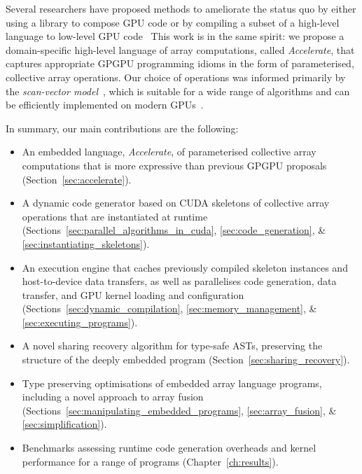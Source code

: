 Several researchers have proposed methods to ameliorate the status quo by either
using a library to compose GPU code or by compiling a subset of a high-level
language to low-level GPU
code~\cite{McCool:2004,Bond:2010bd,ThrustAParallelT:ub,Catanzaro:2011cn,Mainland:2010vj,CLyther:EvXSiruK}
This work is in the same spirit: we propose a domain-specific high-level
language of array computations, called \emph{Accelerate}, that captures
appropriate GPGPU programming idioms in the form of parameterised, collective
array operations. Our choice of operations was informed primarily by the
\emph{scan-vector model}~\cite{Chatterjee:1990vj}, which is suitable for a wide
range of algorithms and can be efficiently implemented on modern
GPUs~\cite{Sengupta:2007tc}.

In summary, our main contributions are the following:
%
\begin{itemize}
    \item An embedded language, \emph{Accelerate}, of parameterised collective
        array computations that is more expressive than previous GPGPU proposals
        (Section~\ref{sec:accelerate}).

    \item A dynamic code generator based on CUDA skeletons of collective array
        operations that are instantiated at runtime
        (Sections~\ref{sec:parallel_algorithms_in_cuda},
        \ref{sec:code_generation}, \&
        \ref{sec:instantiating_skeletons}).

    \item An execution engine that caches previously compiled skeleton instances
        and host-to-device data transfers, as well as parallelises code
        generation, data transfer, and GPU kernel loading and configuration
        (Sections~\ref{sec:dynamic_compilation},
        \ref{sec:memory_management}, \&
        \ref{sec:executing_programs}).

    \item A novel sharing recovery algorithm for type-safe ASTs, preserving the
        structure of the deeply embedded program
        (Section~\ref{sec:sharing_recovery}).

    \item Type preserving optimisations of embedded array language programs,
        including a novel approach to array fusion %
        (Sections~\ref{sec:manipulating_embedded_programs},
        \ref{sec:array_fusion}, \&
        \ref{sec:simplification}).

    \item Benchmarks assessing runtime code generation overheads and kernel
        performance for a range of programs (Chapter~\ref{ch:results}).
\end{itemize}

